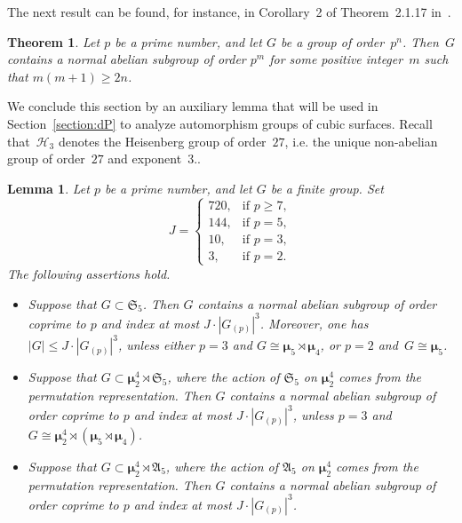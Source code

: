 \documentclass[12pt]{amsart}
\numberwithin{equation}{section}
\newtheorem{lemma}[subsection]{Lemma}
\newtheorem{theorem}[subsection]{Theorem}
\theoremstyle{definition}
\newcommand{\mumu}{\boldsymbol{\mu}}
\newcommand{\HHH}{\mathscr{H}}
\def \ge {\geqslant}
\def \le {\leqslant}
\begin{document}
The next result can be found, for instance,
in Corollary~2 of Theorem~2.1.17 in~\cite{Suzuki}.

\begin{theorem}
\label{theorem:normal-in-a-p-group}
Let $p$ be a prime number, and let $G$ be a group of order~$p^n$.
Then~$G$ contains a normal abelian subgroup of order $p^m$ for some
positive integer~$m$ such that $m(m+1)\ge 2n$.
\end{theorem}


We conclude this section by an auxiliary lemma that will be used
in Section~\ref{section:dP} to analyze automorphism groups of cubic surfaces.
Recall that~$\HHH_3$ denotes the Heisenberg group of order~$27$, i.e. the unique non-abelian group of order~$27$ and exponent~$3$..


\begin{lemma}\label{lemma:auxiliary-subgroups}
Let $p$ be a prime number, and let $G$ be a finite group.
Set
\begin{equation}\label{eq:auxiliary-subgroups}
J=\begin{cases}
720, &\text{if\ } p\ge 7,\\
144, &\text{if\ } p=5,\\
10, &\text{if\ } p=3,\\
3, &\text{if\ } p=2.
\end{cases}
\end{equation}
The following assertions hold.
\begin{itemize}
\item[(i)] Suppose that $G\subset\mathfrak{S}_5$. Then $G$ contains a normal abelian subgroup
of order coprime to $p$ and index at most $J\cdot |G_{(p)}|^3$.
Moreover, one has~\mbox{$|G|\le J\cdot |G_{(p)}|^3$}, unless either $p=3$ and $G\cong\mumu_5\rtimes\mumu_4$, or $p=2$ and~\mbox{$G\cong\mumu_5$}.

\item[(ii)] Suppose that $G\subset \mumu_2^4\rtimes\mathfrak{S}_5$, where
the action of $\mathfrak{S}_5$ on $\mumu_2^4$ comes from the permutation representation.
Then $G$ contains a normal abelian subgroup
of order coprime to $p$ and index at most $J\cdot |G_{(p)}|^3$,
unless $p=3$ and~\mbox{$G\cong\mumu_2^4\rtimes (\mumu_5\rtimes\mumu_4)$}.

\item[(iii)] Suppose that $G\subset \mumu_2^4\rtimes\mathfrak{A}_5$, where
the action of $\mathfrak{A}_5$ on $\mumu_2^4$ comes from the permutation representation.
Then $G$ contains a normal abelian subgroup
of order coprime to $p$ and index at most $J\cdot |G_{(p)}|^3$.


\end{itemize}
\end{lemma}
\end{document}

